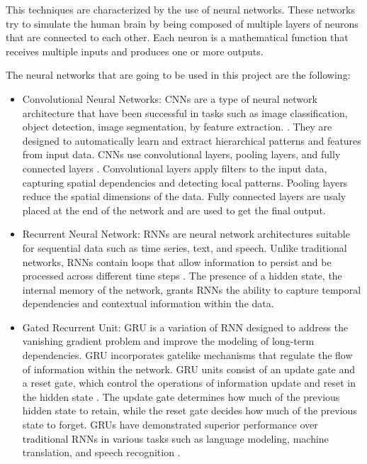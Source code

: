 This techniques are characterized by the use of neural networks. These networks try to simulate the human brain by being composed of multiple layers of neurons that are connected to each other. Each neuron is a mathematical function that receives multiple inputs and produces one or more outputs.

The neural networks that are going to be used in this project are the following:

\begin{itemize}
	\item Convolutional Neural Networks: CNNs are a type of neural network architecture that have been successful in tasks such as image classification, object detection, image segmentation, by feature extraction. \cite{valueva2020cnn}. They are designed to automatically learn and extract hierarchical patterns and features from input data. CNNs use convolutional layers, pooling layers, and fully connected layers \cite{taye2023layers}. Convolutional layers apply filters to the input data, capturing spatial dependencies and detecting local patterns. Pooling layers reduce the spatial dimensions of the data. Fully connected layers are usaly placed at the end of the network and are used to get the final output.
	\item Recurrent Neural Network: RNNs are neural network architectures suitable for sequential data such as time series, text, and speech\cite{li2015rnn_structure}. Unlike traditional networks, RNNs contain loops that allow information to persist and be processed across different time steps \cite{dupond2019rnn}. The presence of a hidden state, the internal memory of the network, grants RNNs the ability to capture temporal dependencies and contextual information within the data.
	\item Gated Recurrent Unit: GRU is a variation of RNN designed to address the vanishing gradient problem and improve the modeling of long-term dependencies. GRU incorporates gatelike mechanisms that regulate the flow of information within the network. GRU units consist of an update gate and a reset gate, which control the operations of information update and reset in the hidden state \cite{cho2014gru}. The update gate determines how much of the previous hidden state to retain, while the reset gate decides how much of the previous state to forget. GRUs have demonstrated superior performance over traditional RNNs in various tasks such as language modeling, machine translation, and speech recognition \cite{ravanelli2018gruperformance}.
\end{itemize}


